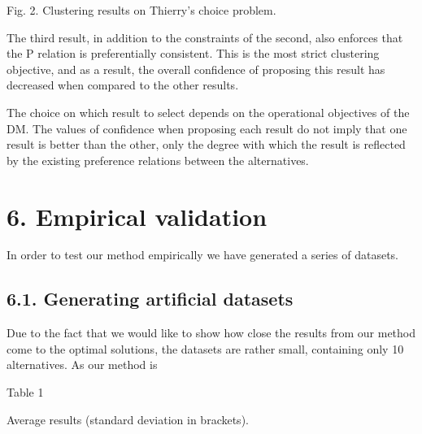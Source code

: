 \documentclass[10pt]{article}
\begin{document}
Fig. 2. Clustering results on Thierry's choice problem.

The third result, in addition to the constraints of the second, also enforces that the $\mathrm{P}$ relation is preferentially consistent. This is the most strict clustering objective, and as a result, the overall confidence of proposing this result has decreased when compared to the other results.

The choice on which result to select depends on the operational objectives of the DM. The values of confidence when proposing each result do not imply that one result is better than the other, only the degree with which the result is reflected by the existing preference relations between the alternatives.

\section*{6. Empirical validation}
In order to test our method empirically we have generated a series of datasets.

\subsection*{6.1. Generating artificial datasets}
Due to the fact that we would like to show how close the results from our method come to the optimal solutions, the datasets are rather small, containing only 10 alternatives. As our method is

Table 1

Average results (standard deviation in brackets).
\end{document}
